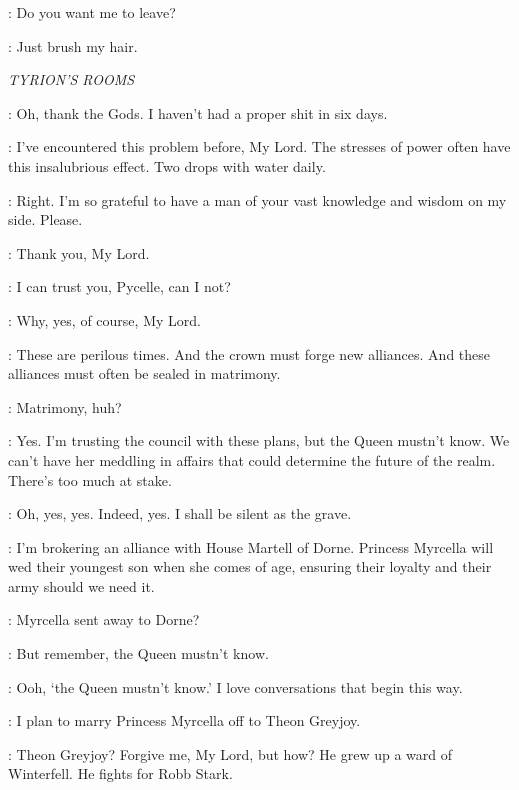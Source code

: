 \SHAE: Do you want me to leave? 

\SANSA: Just brush my hair. 



\scene

\textit{TYRION'S ROOMS} 


\TYRION: Oh, thank the Gods. I haven't had a proper shit in six days. 

\PYCELLE: I've encountered this problem before, My Lord. The stresses of power often have this insalubrious effect. Two drops with water daily. 

\TYRION: Right. I'm so grateful to have a man of your vast knowledge and wisdom on my side. Please. 


\PYCELLE: Thank you, My Lord. 

\TYRION: I can trust you, Pycelle, can I not? 

\PYCELLE: Why, yes, of course, My Lord. 

\TYRION: These are perilous times. And the crown must forge new alliances. And these alliances must often be sealed in matrimony. 

\PYCELLE: Matrimony, huh? 

\TYRION: Yes. I'm trusting the council with these plans, but the Queen mustn't know. We can't have her meddling in affairs that could determine the future of the realm. There's too much at stake. 

\PYCELLE: Oh, yes, yes. Indeed, yes. I shall be silent as the grave. 

\TYRION: I'm brokering an alliance with House Martell of Dorne. Princess Myrcella will wed their youngest son when she comes of age, ensuring their loyalty and their army should we need it. 

\PYCELLE: Myrcella sent away to Dorne? 

\TYRION: But remember, the Queen mustn't know. 


\VARYS: Ooh, `the Queen mustn't know.' I love conversations that begin this way. 

\TYRION: I plan to marry Princess Myrcella off to Theon Greyjoy. 

\VARYS: Theon Greyjoy? Forgive me, My Lord, but how? He grew up a ward of Winterfell. He fights for Robb Stark. 

